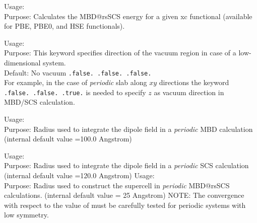 {
  \noindent
  Usage:  \\[1.0ex]
  Purpose: Calculates the MBD@rsSCS energy for a given xc functional
  (available for PBE, PBE0, and HSE functionals). 
\\
}

{
  \noindent
  Usage:   \\[1.0ex]
  Purpose: This keyword specifies direction of the vacuum region in case of a low-dimensional system.\\
  Default: No vacuum  \texttt{.false.  .false.  .false.} \\
  For example, in the case of {\it periodic} slab along $xy$ directions the keyword\\
   \texttt{.false.  .false.  .true.} is needed to specify  
  $z$ as vacuum direction in MBD/SCS calculation.
}

{
  \noindent
  Usage:   \\[1.0ex]
  Purpose: Radius used to integrate the dipole field in a {\it periodic} MBD calculation (internal default value =100.0 Angstrom)
}

{
  \noindent
  Usage:   \\[1.0ex]
  Purpose: Radius used to integrate the dipole field in a {\it periodic} SCS calculation (internal default value =120.0 Angstrom) 
}
{
  \noindent
  Usage:   \\[1.0ex]
  Purpose: Radius used to construct the supercell in {\it periodic} MBD@rsSCS calculations. (internal default value = 25 Angstrom)
  NOTE: The convergence with respect to the value of  must be carefully tested for periodic systems with low symmetry.
}

